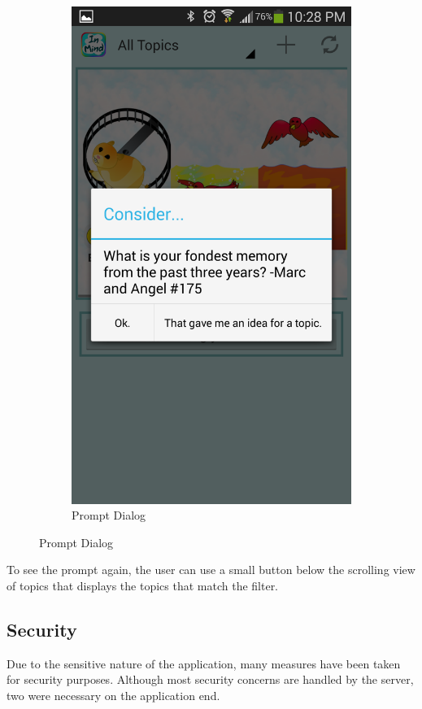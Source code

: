 \begin{figure}
\begin{subfigure}[b]{0.3\textwidth}
        \includegraphics[width=\textwidth]{prompt_dialog.png}
        \caption{Prompt Dialog}
      \end{subfigure}
      \label{fig:notification}
    \end{figure}

      To see the prompt again, the user can use a small button
      below the scrolling view of topics that displays the topics
      that match the filter.

    \subsection{Security}
      Due to the sensitive nature of the application,
      many measures have been taken for security purposes.
      Although most security concerns are handled by the server,
      two were necessary on the application end.

